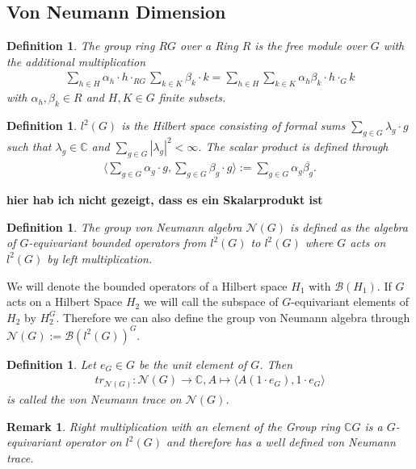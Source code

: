 \documentclass[12pt,a4paper]{scrartcl}
\newtheorem{Definition}[Theorem]{Definition}
\newtheorem{Remark}[Theorem]{Remark}
\numberwithin{equation}{section}
\newcommand{\C}{\mathbb{C}} %
\newcommand{\2}{\mathbb{Z} / 2 \mathbb{Z}}
\newcommand{\1}{\overline{1}}
\newcommand{\0}{\overline{0}}
\begin{document}
\subsection{Von Neumann Dimension}

\begin{Definition}
	The group ring $RG$ over a Ring $R$ is the free module over $G$ with the additional multiplication
	\begin{align*}
		\sum_{h \in H} \alpha_h \cdot h \cdot_{RG} \sum_{k \in K} \beta_k \cdot k = \sum_{h \in H} \sum_{k \in K} \alpha_h \beta_k \cdot h \cdot_G k
	\end{align*}
	with $\alpha_h, \beta_k \in R$ and $H, K \in G$ finite subsets.
\end{Definition}
\begin{Definition}
	$l^2(G)$ is the Hilbert space consisting of formal sums $\sum_{g \in G} \lambda_g \cdot g$ such that $\lambda_g \in \C$ and $\sum_{g \in G} |\lambda_g|^2 < \infty$. The scalar product is defined through
	\begin{align*}
		\langle \sum_{g \in G} \alpha_g \cdot g, \sum_{g \in G} \beta_g \cdot g \rangle := \sum_{g \in G} \alpha_g \overline{\beta_g}.
	\end{align*}
\end{Definition}
\textbf{hier hab ich nicht gezeigt, dass es ein Skalarprodukt ist}
\begin{Definition}
	The group von Neumann algebra $\mathcal{N}(G)$ is defined as the algebra of $G$-equivariant bounded operators from $l^2(G)$ to $l^2(G)$ where $G$ acts on $l^2(G)$ by left multiplication.
\end{Definition}
We will denote the bounded operators of a Hilbert space $H_1$ with $\mathcal{B}(H_1)$. If $G$ acts on a Hilbert Space $H_2$ we will call the subspace of $G$-equivariant elements of $H_2$ by $H_2^G$. Therefore we can also define the group von Neumann algebra through $\mathcal{N}(G) := \mathcal{B}(l^2(G))^G$.
\begin{Definition}
	Let $e_G \in G$ be the unit element of $G$. Then
	\begin{align*}
		tr_{\mathcal{N}(G)}: \mathcal{N}(G) \to \C, A  \mapsto \langle A(1 \cdot e_G), 1 \cdot e_G \rangle
	\end{align*}
	is called the von Neumann trace on $\mathcal{N}(G)$.
\end{Definition}
\begin{Remark}
	Right multiplication with an element of the Group ring $\C G$ is a $G$-equivariant operator on $l^2(G)$ and therefore has a well defined von Neumann trace.
\end{Remark}
\end{document}
